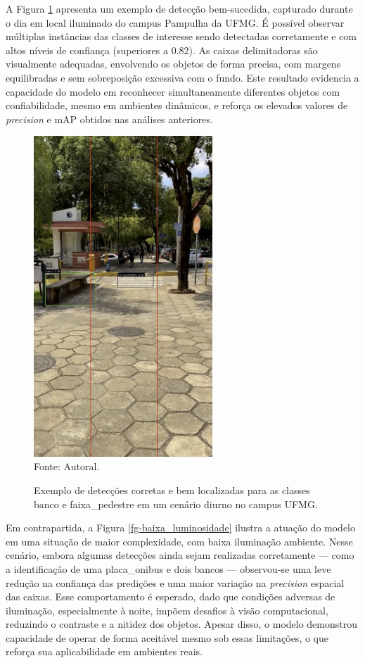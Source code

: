A Figura \ref{fg-exemplo-deteccao-dia} apresenta um exemplo de detecção bem-sucedida, capturado durante o dia em local iluminado do campus Pampulha da UFMG. É possível observar múltiplas instâncias das classes de interesse sendo detectadas corretamente e com altos níveis de confiança (superiores a 0.82). As caixas delimitadoras são visualmente adequadas, envolvendo os objetos de forma precisa, com margens equilibradas e sem sobreposição excessiva com o fundo. Este resultado evidencia a capacidade do modelo em reconhecer simultaneamente diferentes objetos com confiabilidade, mesmo em ambientes dinâmicos, e reforça os elevados valores de \textit{precision} e mAP obtidos nas análises anteriores.

\begin{figure}[htbp]
  \centering
  \caption{Exemplo de detecções corretas e bem localizadas para as classes banco e faixa\_pedestre em um cenário diurno no campus UFMG.}
  \includegraphics[width=0.6\textwidth]{Figuras/exemplo-deteccao-dia.png}
  \\
  Fonte: Autoral.
  \label{fg-exemplo-deteccao-dia}
\end{figure}

Em contrapartida, a Figura \ref{fg-baixa_luminosidade} ilustra a atuação do modelo em uma situação de maior complexidade, com baixa iluminação ambiente. Nesse cenário, embora algumas detecções ainda sejam realizadas corretamente — como a identificação de uma placa\_onibus e dois bancos — observou-se uma leve redução na confiança das predições e uma maior variação na \textit{precision} espacial das caixas. Esse comportamento é esperado, dado que condições adversas de iluminação, especialmente à noite, impõem desafios à visão computacional, reduzindo o contraste e a nitidez dos objetos. Apesar disso, o modelo demonstrou capacidade de operar de forma aceitável mesmo sob essas limitações, o que reforça sua aplicabilidade em ambientes reais.

